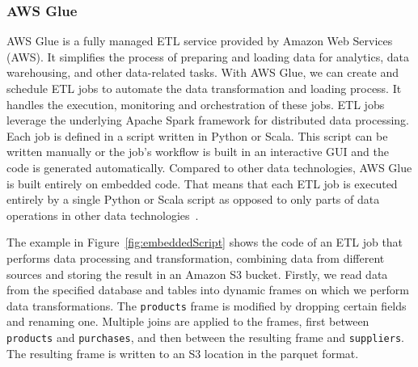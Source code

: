 \subsubsection{AWS Glue}
AWS Glue is a fully managed ETL service provided by Amazon Web Services (AWS). It simplifies the process of preparing and loading data for analytics, data warehousing, and other data-related tasks. With AWS Glue, we can create and schedule ETL jobs to automate the data transformation and loading process. It handles the execution, monitoring and orchestration of these jobs. ETL jobs leverage the underlying Apache Spark framework for distributed data processing. Each job is defined in a script written in Python or Scala. This script can be written manually or the job's workflow is built in an interactive GUI and the code is generated automatically. Compared to other data technologies, AWS Glue is built entirely on embedded code. That means that each ETL job is executed entirely by a single Python or Scala script as opposed to only parts of data operations in other data technologies~\cite{awsglueintro}.
\par
The example in Figure~\ref{fig:embeddedScript} shows the code of an ETL job that performs data processing and transformation, combining data from different sources and storing the result in an Amazon S3 bucket. Firstly, we read data from the specified database and tables into dynamic frames on which we perform data transformations. The \texttt{products} frame is modified by dropping certain fields and renaming one. Multiple joins are applied to the frames, first between \texttt{products} and \texttt{purchases}, and then between the resulting frame and \texttt{suppliers}. The resulting frame is written to an S3 location in the parquet format.

